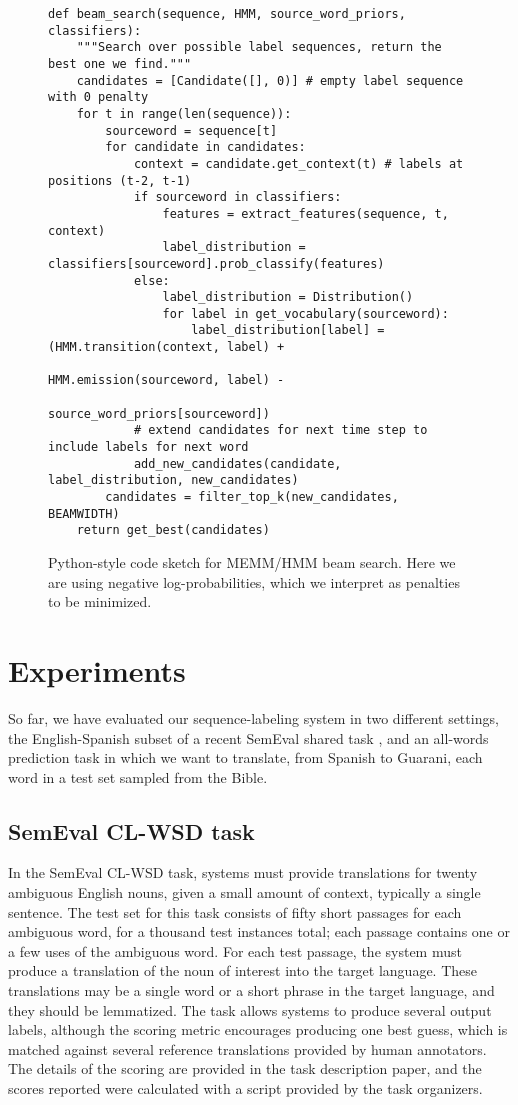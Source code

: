 \documentclass[11pt]{article}
\begin{document}
\begin{figure*}
\begin{lstlisting}[frame=none]
def beam_search(sequence, HMM, source_word_priors, classifiers):
    """Search over possible label sequences, return the best one we find."""
    candidates = [Candidate([], 0)] # empty label sequence with 0 penalty
    for t in range(len(sequence)):
        sourceword = sequence[t]
        for candidate in candidates:
            context = candidate.get_context(t) # labels at positions (t-2, t-1)
            if sourceword in classifiers:
                features = extract_features(sequence, t, context)
                label_distribution = classifiers[sourceword].prob_classify(features)
            else:
                label_distribution = Distribution()
                for label in get_vocabulary(sourceword):
                    label_distribution[label] = (HMM.transition(context, label) +
                                                 HMM.emission(sourceword, label) -
                                                 source_word_priors[sourceword])
            # extend candidates for next time step to include labels for next word
            add_new_candidates(candidate, label_distribution, new_candidates)
        candidates = filter_top_k(new_candidates, BEAMWIDTH)
    return get_best(candidates)
\end{lstlisting}
\caption{Python-style code sketch for MEMM/HMM beam search. Here we are using
negative log-probabilities, which we interpret as penalties to be minimized.}
\label{fig:beamsearch}
\end{figure*}

\section{Experiments}
So far, we have evaluated our sequence-labeling system in two different
settings, the English-Spanish subset of a recent SemEval shared task
\cite{task10},
and an all-words prediction task in which we want to translate, from Spanish to
Guarani, each word in a test set sampled from the Bible.

\subsection{SemEval CL-WSD task}
In the SemEval CL-WSD task, systems must provide translations for twenty
ambiguous English nouns, given a small amount of context, typically a single
sentence. The test set for this task consists of fifty short passages for each
ambiguous word, for a thousand test instances total; each passage contains one
or a few uses of the ambiguous word. For each test passage, the system must
produce a translation of the noun of interest into the target language.  These
translations may be a single word or a short phrase in the target language, and
they should be lemmatized. The task allows systems to produce several output
labels, although the scoring metric encourages producing one best guess, which
is matched against several reference translations provided by human annotators.
The details of the scoring are provided in the task description paper, and the
scores reported were calculated with a script provided by the task organizers.
\end{document}
